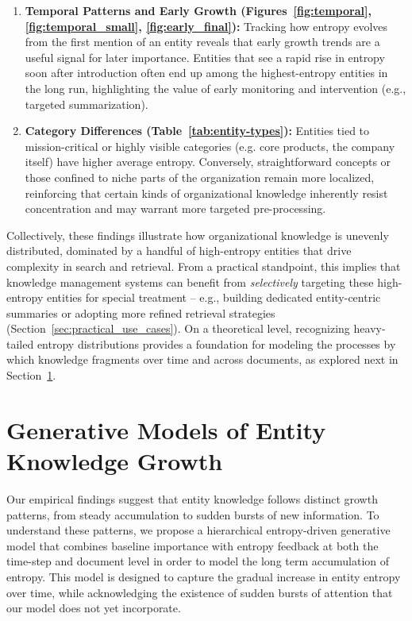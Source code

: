 \documentclass[11pt,a4paper]{article}
\begin{document}
\begin{enumerate}
    \item \textbf{Temporal Patterns and Early Growth (Figures~\ref{fig:temporal}, \ref{fig:temporal_small}, \ref{fig:early_final}):}
    Tracking how entropy evolves from the first mention of an entity reveals that early growth trends are a useful signal for later importance. Entities that see a rapid rise in entropy soon after introduction often end up among the highest-entropy entities in the long run, highlighting the value of early monitoring and intervention (e.g., targeted summarization).

    \item \textbf{Category Differences (Table~\ref{tab:entity-types}):}
    Entities tied to mission-critical or highly visible categories (e.g. core products, the company itself) have higher average entropy. Conversely, straightforward concepts or those confined to niche parts of the organization remain more localized, reinforcing that certain kinds of organizational knowledge inherently resist concentration and may warrant more targeted pre-processing.

\end{enumerate}

Collectively, these findings illustrate how organizational knowledge is unevenly distributed, dominated by a handful of high-entropy entities that drive complexity in search and retrieval. From a practical standpoint, this implies that knowledge management systems can benefit from \emph{selectively} targeting these high-entropy entities for special treatment -- e.g., building dedicated entity-centric summaries or adopting more refined retrieval strategies (Section~\ref{sec:practical_use_cases}). On a theoretical level, recognizing heavy-tailed entropy distributions provides a foundation for modeling the processes by which knowledge fragments over time and across documents, as explored next in Section~\ref{sec:generative_models}.


\FloatBarrier
\section{Generative Models of Entity Knowledge Growth}
\label{sec:generative_models}

Our empirical findings suggest that entity knowledge follows distinct growth patterns, from steady accumulation to sudden bursts of new information. To understand these patterns, we propose a hierarchical entropy-driven generative model that combines baseline importance with entropy feedback at both the time-step and document level in order to model the long term accumulation of entropy. This model is designed to capture the gradual increase in entity entropy over time, while acknowledging the existence of sudden bursts of attention that our model does not yet incorporate.
\end{document}
